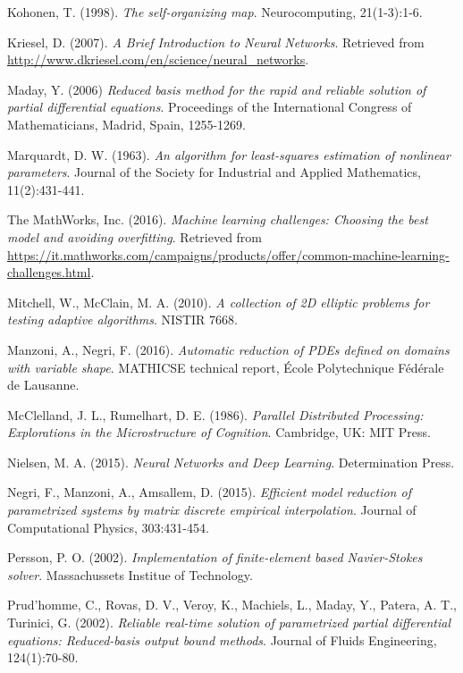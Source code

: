 \documentclass[12pt, a4paper, twoside, openright]{report}
\numberwithin{equation}{chapter}
\theoremstyle{theorem}
\theoremstyle{definition}
\theoremstyle{remark}
\theoremstyle{proposition}
\numberwithin{figure}{chapter}
\begin{document}
\begin{thebibliography}{50}
		Kohonen, T. (1998). \emph{The self-organizing map}. Neurocomputing, 21(1-3):1-6.
		
		Kriesel, D. (2007). \emph{A Brief Introduction to Neural Networks}. Retrieved from \url{http://www.dkriesel.com/en/science/neural_networks}.
		
		Maday, Y. (2006) \emph{Reduced basis method for the rapid and reliable solution of partial differential equations}. Proceedings of the International Congress of Mathematicians, Madrid, Spain, 1255-1269.
		
		Marquardt, D. W. (1963). \emph{An algorithm for least-squares estimation of nonlinear parameters}. Journal of the Society for Industrial and Applied Mathematics, 11(2):431-441.
		
		The MathWorks, Inc. (2016). \emph{Machine learning challenges: Choosing the best model and avoiding overfitting}. Retrieved from \url{https://it.mathworks.com/campaigns/products/offer/common-machine-learning-challenges.html}.
		
		Mitchell, W., McClain, M. A. (2010). \emph{A collection of 2D elliptic problems for testing adaptive algorithms}. NISTIR 7668.
		
		Manzoni, A., Negri, F. (2016). \emph{Automatic reduction of PDEs defined on domains with variable shape}. MATHICSE technical report, \'Ecole Polytechnique F\'ed\'erale de Lausanne.
						
		McClelland, J. L., Rumelhart, D. E. (1986). \emph{Parallel Distributed Processing: Explorations in the Microstructure of Cognition}. Cambridge, UK: MIT Press.
		
		Nielsen, M. A. (2015). \emph{Neural Networks and Deep Learning}. Determination Press.
				
		Negri, F., Manzoni, A., Amsallem, D. (2015). \emph{Efficient model reduction of parametrized systems by matrix discrete empirical interpolation}. Journal of Computational Physics, 303:431-454.
		
		Persson, P. O. (2002). \emph{Implementation of finite-element based Navier-Stokes solver}. Massachussets Institue of Technology.
		
		Prud'homme, C., Rovas, D. V., Veroy, K., Machiels, L., Maday, Y., Patera, A. T., Turinici, G. (2002). \emph{Reliable real-time solution of parametrized partial differential equations: Reduced-basis output bound methods}. Journal of Fluids Engineering, 124(1):70-80.
		

\end{thebibliography}
\end{document}
